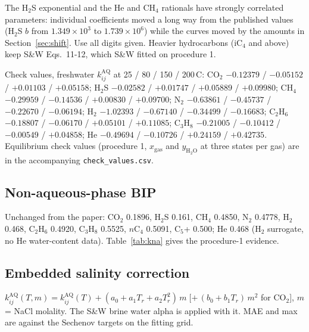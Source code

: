 \documentclass[10pt,a4paper]{article}
\begin{document}
The H$_2$S exponential and the He and CH$_4$ rationals have strongly correlated parameters: individual coefficients moved a long way from the published values (H$_2$S $b$ from $1.349\times10^{3}$ to $1.739\times10^{6}$) while the curves moved by the amounts in Section~\ref{sec:shift}. Use all digits given. Heavier hydrocarbons (iC$_4$ and above) keep S\&W Eqs.~11-12, which S\&W fitted on procedure 1.

Check values, freshwater $k_{ij}^{\mathrm{AQ}}$ at 25 / 80 / 150 / 200\,\textdegree C: CO$_2$ $-0.12379$ / $-0.05152$ / $+0.01103$ / $+0.05158$; H$_2$S $-0.02582$ / $+0.01747$ / $+0.05889$ / $+0.09980$; CH$_4$ $-0.29959$ / $-0.14536$ / $+0.00830$ / $+0.09700$; N$_2$ $-0.63861$ / $-0.45737$ / $-0.22670$ / $-0.06194$; H$_2$ $-1.02393$ / $-0.67140$ / $-0.34499$ / $-0.16683$; C$_2$H$_6$ $-0.18807$ / $-0.06170$ / $+0.05101$ / $+0.11085$; C$_3$H$_8$ $-0.21005$ / $-0.10412$ / $-0.00549$ / $+0.04858$; He $-0.49694$ / $-0.10726$ / $+0.24159$ / $+0.42735$. Equilibrium check values (procedure 1, $x_{\mathrm{gas}}$ and $y_{\mathrm{H_2O}}$ at three states per gas) are in the accompanying \texttt{check\_values.csv}.

\subsection{Non-aqueous-phase BIP}
Unchanged from the paper: CO$_2$ 0.1896, H$_2$S 0.161, CH$_4$ 0.4850, N$_2$ 0.4778, H$_2$ 0.468, C$_2$H$_6$ 0.4920, C$_3$H$_8$ 0.5525, $n$C$_4$ 0.5091, C$_5$+ 0.500; He 0.468 (H$_2$ surrogate, no He water-content data). Table~\ref{tab:kna} gives the procedure-1 evidence.

\subsection{Embedded salinity correction}
$k_{ij}^{\mathrm{AQ}}(T,m) = k_{ij}^{\mathrm{AQ}}(T) + (a_0 + a_1T_r + a_2T_r^2)\,m\;[+\,(b_0 + b_1T_r)\,m^2$ for CO$_2$], $m$ = NaCl molality. The S\&W brine water alpha is applied with it. MAE and max are against the Sechenov targets on the fitting grid.
\end{document}
